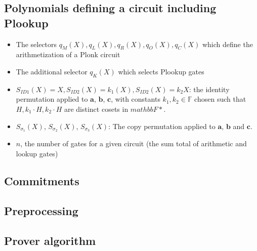 \documentclass[fleqn]{article}
\begin{document}
		\subsection{Polynomials defining a circuit including Plookup}
			\begin{itemize}
				\item The selectors $q_M(X), q_L(X), q_R(X), q_O(X), q_C(X)$ which define the arithmetization of a Plonk circuit
				\item The additional selector $q_K(X)$ which selects Plookup gates
				\item $S_{ID1}(X) = X, S_{ID2}(X) = k_1(X), S_{ID2}(X)=k_2X$: the identity permutation applied to $\mathbf{a}$, $\mathbf{b}$, $\mathbf{c}$, with constants $k_1, k_2\in \mathbb{F}$ chosen such that $H, k_1\cdot H, k_2\cdot H$ are distinct cosets in $mathbb{F*}$.
				\item $S_{\sigma_1}(X)$, $S_{\sigma_2}(X)$, $S_{\sigma_3}(X)$: The copy permutation applied to $\mathbf{a}$, $\mathbf{b}$ and $\mathbf{c}$.
				\item $n$, the number of gates for a given circuit (the sum total of arithmetic and lookup gates)
			\end{itemize}
		\subsection{Commitments}
		\subsection{Preprocessing}
		\subsection{Prover algorithm}
\end{document}
